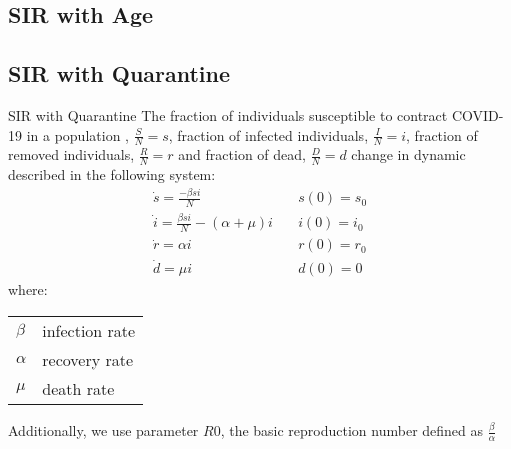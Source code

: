 \documentclass{beamer}
\makeatletter
\newenvironment{conditions}
  {\par\vspace{\abovedisplayskip}\noindent\begin{tabular}{>{$}l<{$} @{${}={}$} l}}
  {\end{tabular}\par\vspace{\belowdisplayskip}}
\makeatother
\begin{document}
\subsection{SIR with Age}



\subsection{SIR with Quarantine}
\begin{frame}{SIR with Quarantine}
The fraction of individuals susceptible to contract COVID-19 in a population , $\frac{S}{N} = s$, fraction of infected individuals, $\frac{I}{N} = i$, fraction of removed individuals, $\frac{R}{N} = r$ and fraction of dead, $\frac{D}{N} = d$ change in dynamic described in the following system: 
\begin{equation}
       \begin{array}{ll}
      \dot{s} = \frac{- \beta s i}{N}  & \quad s(0) = s_0 \\
       \dot{i} = \frac{\beta s i}{N} - (\alpha + \mu)i & \quad i(0) = i_0 \\
       \dot{r} = \alpha i  & \quad r(0) = r_0 \\ 
       \dot{d} = \mu i & \quad d(0) = 0 
        \end{array}
\end{equation}
where:
\begin{conditions}
\beta & infection rate \\
\alpha & recovery rate \\
\mu & death rate \\
\end{conditions}

Additionally, we use parameter $R0$, the basic reproduction number defined as $\frac{\beta}{\alpha}$

\end{frame}
\end{document}
